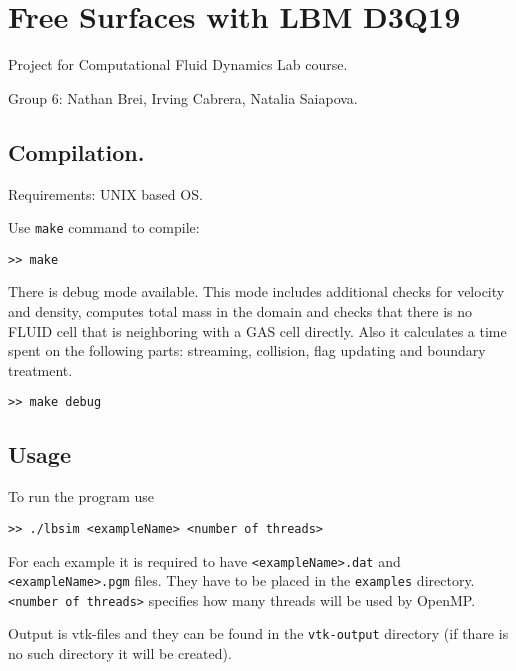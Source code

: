 \documentclass{article}
\begin{document}
\section{Free Surfaces with LBM
D3Q19}\label{free-surfaces-with-lbm-d3q19}

Project for Computational Fluid Dynamics Lab course.

Group 6: Nathan Brei, Irving Cabrera, Natalia Saiapova.

\subsection{Compilation.}\label{compilation.}

Requirements: UNIX based OS.

Use \texttt{make} command to compile:

\begin{verbatim}
>> make
\end{verbatim}

There is debug mode available. This mode includes additional checks for
velocity and density, computes total mass in the domain and checks that
there is no FLUID cell that is neighboring with a GAS cell directly.
Also it calculates a time spent on the following parts: streaming,
collision, flag updating and boundary treatment.

\begin{verbatim}
>> make debug
\end{verbatim}

\subsection{Usage}\label{usage}

To run the program use

\begin{verbatim}
>> ./lbsim <exampleName> <number of threads>
\end{verbatim}

For each example it is required to have
\texttt{\textless{}exampleName\textgreater{}.dat} and
\texttt{\textless{}exampleName\textgreater{}.pgm} files. They have to be
placed in the \texttt{examples} directory.\\
\texttt{\textless{}number\ of\ threads\textgreater{}} specifies how many
threads will be used by OpenMP.

Output is vtk-files and they can be found in the \texttt{vtk-output}
directory (if thare is no such directory it will be created).
\end{document}
